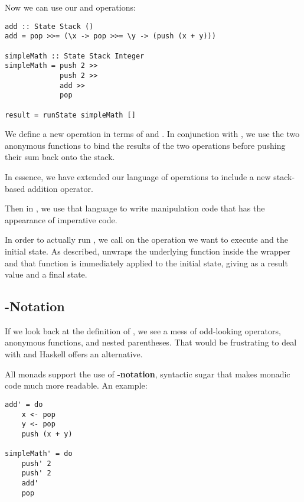 Now we can use our  and  operations:

\begin{lstlisting}
add :: State Stack ()
add = pop >>= (\x -> pop >>= \y -> (push (x + y)))

simpleMath :: State Stack Integer
simpleMath = push 2 >>
             push 2 >>
             add >>
             pop

result = runState simpleMath []
\end{lstlisting}

\begin{notelist}
    \item We define a new operation  in terms of  and . In conjunction with \code{(>>=)},
          we use the two anonymous functions to bind the results of the two  operations before pushing their sum
          back onto the stack.
    \item In essence, we have extended our language of  operations to include a new stack-based addition operator.
    \item Then in , we use that language to write  manipulation code that has the appearance of
          imperative code. 
\end{notelist}

In order to actually run , we call  on the operation we want to execute and the initial state.
As described,  unwraps the underlying function inside the  wrapper and that function is immediately
applied to the initial state, giving as a result value and a final state.

\subsection{-Notation}

If we look back at the definition of , we see a mess of odd-looking operators, anonymous functions, and nested
parentheses. That would be frustrating to deal with and Haskell offers an alternative.

All monads support the use of \textbf{-notation}, syntactic sugar that makes monadic code much more readable.
An example:

\begin{lstlisting}
add' = do
    x <- pop
    y <- pop
    push (x + y)

simpleMath' = do
    push' 2
    push' 2
    add'
    pop
\end{lstlisting}

